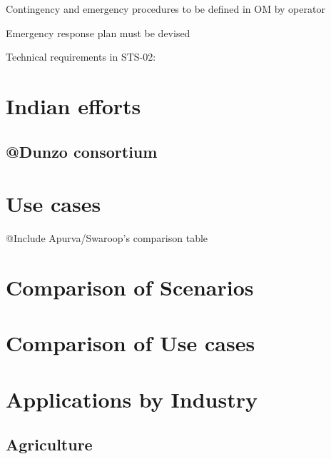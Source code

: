 \documentclass{ua_wgs_base}
\begin{document}
Contingency and emergency procedures to be defined in OM by operator

Emergency response plan must be devised 

Technical requirements in STS-02:

\section{Indian efforts}

\subsection{@Dunzo consortium}

\section{Use cases}

\begin{lyxgreyedout}
@Include Apurva/Swaroop's comparison table%
\end{lyxgreyedout}


\section{Comparison of Scenarios}

\section{Comparison of Use cases}

\section{Applications by Industry}

\subsection{Agriculture}
\end{document}
